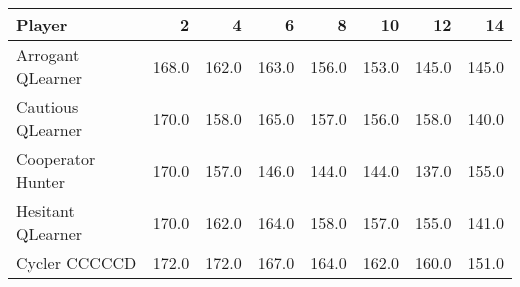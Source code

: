 \begin{tabular}{lrrrrrrr}
\toprule
            Player &      2 &      4 &      6 &      8 &     10 &     12 &     14 \\
\midrule
 Arrogant QLearner &  168.0 &  162.0 &  163.0 &  156.0 &  153.0 &  145.0 &  145.0 \\
 Cautious QLearner &  170.0 &  158.0 &  165.0 &  157.0 &  156.0 &  158.0 &  140.0 \\
 Cooperator Hunter &  170.0 &  157.0 &  146.0 &  144.0 &  144.0 &  137.0 &  155.0 \\
 Hesitant QLearner &  170.0 &  162.0 &  164.0 &  158.0 &  157.0 &  155.0 &  141.0 \\
     Cycler CCCCCD &  172.0 &  172.0 &  167.0 &  164.0 &  162.0 &  160.0 &  151.0 \\
\bottomrule
\end{tabular}
